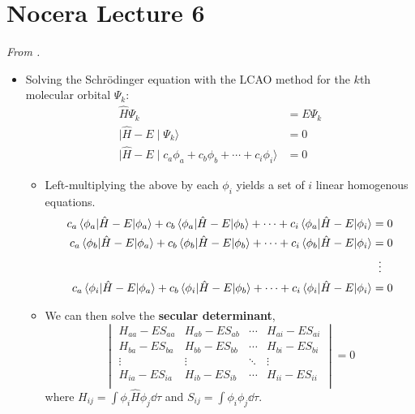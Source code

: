 \documentclass[../notes.tex]{subfiles}
\begin{document}
\section{Nocera Lecture 6}
\emph{From \textcite{bib:NoceraLectures}.}
\begin{itemize}
    \item {}Solving the Schr\"{o}dinger equation with the LCAO method for the $k$th molecular orbital $\Psi_k$:
    \begin{align*}
        \hat{H}\Psi_k &= E\Psi_k\\
        \mid \hat{H}-E\mid\Psi_k\rangle &= 0\\
        \mid \hat{H}-E\mid c_a\phi_a+c_b\phi_b+\cdots+c_i\phi_i\rangle &= 0
    \end{align*}
    \begin{itemize}
        \item Left-multiplying the above by each $\phi_i$ yields a set of $i$ linear homogenous equations.
        \begin{align*}
            c_a\mel{\phi_a}{\hat{H}-E}{\phi_a}+c_b\mel{\phi_a}{\hat{H}-E}{\phi_b}+\cdots+c_i\mel{\phi_a}{\hat{H}-E}{\phi_i} &= 0\\
            c_a\mel{\phi_b}{\hat{H}-E}{\phi_a}+c_b\mel{\phi_b}{\hat{H}-E}{\phi_b}+\cdots+c_i\mel{\phi_b}{\hat{H}-E}{\phi_i} &= 0\\
            &\hspace{2mm}\vdots\\
            c_a\mel{\phi_i}{\hat{H}-E}{\phi_a}+c_b\mel{\phi_i}{\hat{H}-E}{\phi_b}+\cdots+c_i\mel{\phi_i}{\hat{H}-E}{\phi_i} &= 0
        \end{align*}
        \item We can then solve the \textbf{secular determinant},
        \begin{equation*}
            \begin{vmatrix}
                H_{aa}-ES_{aa} & H_{ab}-ES_{ab} & \cdots & H_{ai}-ES_{ai}\\
                H_{ba}-ES_{ba} & H_{bb}-ES_{bb} & \cdots & H_{bi}-ES_{bi}\\
                \vdots         & \vdots         & \ddots & \vdots\\
                H_{ia}-ES_{ia} & H_{ib}-ES_{ib} & \cdots & H_{ii}-ES_{ii}\\
            \end{vmatrix}
            = 0
        \end{equation*}
        where $H_{ij}=\int\phi_i\hat{H}\phi_j\dd{\tau}$ and $S_{ij}=\int\phi_i\phi_j\dd{\tau}$.

\end{itemize}
\end{itemize}
\end{document}
